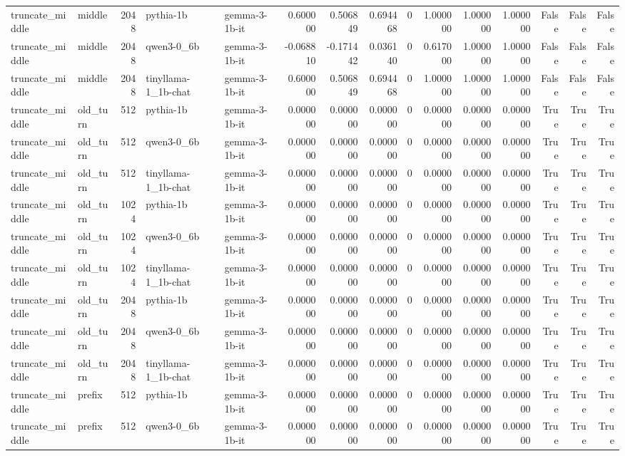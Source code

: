 \begin{tabular}{llrllrrrrrrrrrr}
truncate_middle & middle & 2048 & pythia-1b & gemma-3-1b-it & 0.600000 & 0.506849 & 0.694468 & 0 & 1.000000 & 1.000000 & 1.000000 & False & False & False \\
truncate_middle & middle & 2048 & qwen3-0_6b & gemma-3-1b-it & -0.068810 & -0.171442 & 0.036140 & 0 & 0.617000 & 1.000000 & 1.000000 & False & False & False \\
truncate_middle & middle & 2048 & tinyllama-1_1b-chat & gemma-3-1b-it & 0.600000 & 0.506849 & 0.694468 & 0 & 1.000000 & 1.000000 & 1.000000 & False & False & False \\
truncate_middle & old_turn & 512 & pythia-1b & gemma-3-1b-it & 0.000000 & 0.000000 & 0.000000 & 0 & 0.000000 & 0.000000 & 0.000000 & True & True & True \\
truncate_middle & old_turn & 512 & qwen3-0_6b & gemma-3-1b-it & 0.000000 & 0.000000 & 0.000000 & 0 & 0.000000 & 0.000000 & 0.000000 & True & True & True \\
truncate_middle & old_turn & 512 & tinyllama-1_1b-chat & gemma-3-1b-it & 0.000000 & 0.000000 & 0.000000 & 0 & 0.000000 & 0.000000 & 0.000000 & True & True & True \\
truncate_middle & old_turn & 1024 & pythia-1b & gemma-3-1b-it & 0.000000 & 0.000000 & 0.000000 & 0 & 0.000000 & 0.000000 & 0.000000 & True & True & True \\
truncate_middle & old_turn & 1024 & qwen3-0_6b & gemma-3-1b-it & 0.000000 & 0.000000 & 0.000000 & 0 & 0.000000 & 0.000000 & 0.000000 & True & True & True \\
truncate_middle & old_turn & 1024 & tinyllama-1_1b-chat & gemma-3-1b-it & 0.000000 & 0.000000 & 0.000000 & 0 & 0.000000 & 0.000000 & 0.000000 & True & True & True \\
truncate_middle & old_turn & 2048 & pythia-1b & gemma-3-1b-it & 0.000000 & 0.000000 & 0.000000 & 0 & 0.000000 & 0.000000 & 0.000000 & True & True & True \\
truncate_middle & old_turn & 2048 & qwen3-0_6b & gemma-3-1b-it & 0.000000 & 0.000000 & 0.000000 & 0 & 0.000000 & 0.000000 & 0.000000 & True & True & True \\
truncate_middle & old_turn & 2048 & tinyllama-1_1b-chat & gemma-3-1b-it & 0.000000 & 0.000000 & 0.000000 & 0 & 0.000000 & 0.000000 & 0.000000 & True & True & True \\
truncate_middle & prefix & 512 & pythia-1b & gemma-3-1b-it & 0.000000 & 0.000000 & 0.000000 & 0 & 0.000000 & 0.000000 & 0.000000 & True & True & True \\
truncate_middle & prefix & 512 & qwen3-0_6b & gemma-3-1b-it & 0.000000 & 0.000000 & 0.000000 & 0 & 0.000000 & 0.000000 & 0.000000 & True & True & True \\

\end{tabular}
